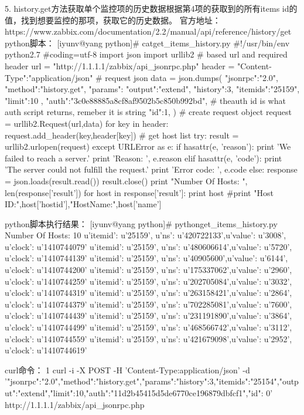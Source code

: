 5.     history.get方法获取单个监控项的历史数据根据第4项的获取到的所有items id的值，找到想要监控的那项，获取它的历史数据。
官方地址：https://www.zabbix.com/documentation/2.2/manual/api/reference/history/get
python脚本：
[iyunv@yang python]# catget_items_history.py
#!/usr/bin/env python2.7
#coding=utf-8
import json
import urllib2
# based url and required header
url = "http://1.1.1.1/zabbix/api_jsonrpc.php"
header = {"Content-Type":"application/json"}
# request json
data = json.dumps(
{
   "jsonrpc":"2.0",
   "method":"history.get",
   "params":{
       "output":"extend",
       "history":3,
       "itemids":"25159",
       "limit":10
   },
   "auth":"3c0e88885a8cf8af9502b5c850b992bd", # theauth id is what auth script returns, remeber it is string
   "id":1,
})
# create request object
request = urllib2.Request(url,data)
for key in header:
   request.add_header(key,header[key])
# get host list
try:
   result = urllib2.urlopen(request)
except URLError as e:
   if hasattr(e, 'reason'):
       print 'We failed to reach a server.'
       print 'Reason: ', e.reason
   elif hasattr(e, 'code'):
       print 'The server could not fulfill the request.'
       print 'Error code: ', e.code
else:
   response = json.loads(result.read())
   result.close()
   print "Number Of Hosts: ", len(response['result'])
   for host in response['result']:
       print host
       #print "Host ID:",host['hostid'],"HostName:",host['name']



python脚本执行结果：
[iyunv@yang python]# pythonget_items_history.py
Number Of Hosts:  10
{u'itemid': u'25159', u'ns': u'420722133',u'value': u'3008', u'clock': u'1410744079'}
{u'itemid': u'25159', u'ns': u'480606614',u'value': u'5720', u'clock': u'1410744139'}
{u'itemid': u'25159', u'ns': u'40905600',u'value': u'6144', u'clock': u'1410744200'}
{u'itemid': u'25159', u'ns': u'175337062',u'value': u'2960', u'clock': u'1410744259'}
{u'itemid': u'25159', u'ns': u'202705084',u'value': u'3032', u'clock': u'1410744319'}
{u'itemid': u'25159', u'ns': u'263158421',u'value': u'2864', u'clock': u'1410744379'}
{u'itemid': u'25159', u'ns': u'702285081',u'value': u'7600', u'clock': u'1410744439'}
{u'itemid': u'25159', u'ns': u'231191890',u'value': u'3864', u'clock': u'1410744499'}
{u'itemid': u'25159', u'ns': u'468566742',u'value': u'3112', u'clock': u'1410744559'}
{u'itemid': u'25159', u'ns': u'421679098',u'value': u'2952', u'clock': u'1410744619'}



curl命令：
1
curl -i -X POST -H 'Content-Type:application/json' -d '{"jsonrpc":"2.0","method":"history.get","params":{"history":3,"itemids":"25154","output":"extend","limit":10},"auth":"11d2b45415d5de6770ce196879dbfcf1","id": 0}' http://1.1.1.1/zabbix/api_jsonrpc.php



